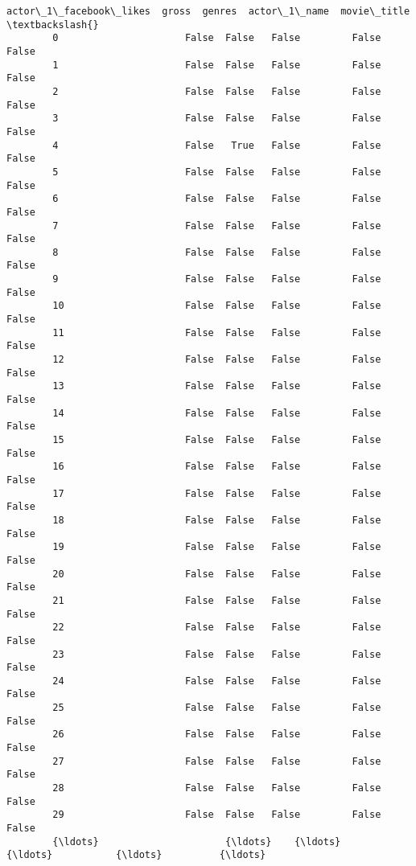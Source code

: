 \documentclass[11pt]{article}
\begin{document}
\begin{Verbatim}[commandchars=\\\{\}]
              actor\_1\_facebook\_likes  gross  genres  actor\_1\_name  movie\_title  \textbackslash{}
        0                      False  False   False         False        False   
        1                      False  False   False         False        False   
        2                      False  False   False         False        False   
        3                      False  False   False         False        False   
        4                      False   True   False         False        False   
        5                      False  False   False         False        False   
        6                      False  False   False         False        False   
        7                      False  False   False         False        False   
        8                      False  False   False         False        False   
        9                      False  False   False         False        False   
        10                     False  False   False         False        False   
        11                     False  False   False         False        False   
        12                     False  False   False         False        False   
        13                     False  False   False         False        False   
        14                     False  False   False         False        False   
        15                     False  False   False         False        False   
        16                     False  False   False         False        False   
        17                     False  False   False         False        False   
        18                     False  False   False         False        False   
        19                     False  False   False         False        False   
        20                     False  False   False         False        False   
        21                     False  False   False         False        False   
        22                     False  False   False         False        False   
        23                     False  False   False         False        False   
        24                     False  False   False         False        False   
        25                     False  False   False         False        False   
        26                     False  False   False         False        False   
        27                     False  False   False         False        False   
        28                     False  False   False         False        False   
        29                     False  False   False         False        False   
        {\ldots}                      {\ldots}    {\ldots}     {\ldots}           {\ldots}          {\ldots}   

\end{Verbatim}
\end{document}
